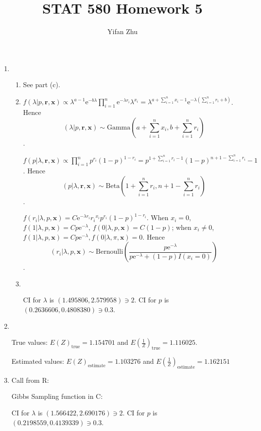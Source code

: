 \documentclass{article}
\begin{document}
	

	
	\title{STAT 580 Homework 5}
	\author{Yifan Zhu}
	\maketitle
	
	\begin{enumerate}[leftmargin = 0 em, label = \arabic*., font = \bfseries]
	\item 
	\begin{enumerate}
		\item 
		See part (c).
		\item 
		$f(\lambda | p, \bm r, \bm x) \propto \lambda^{a-1} \mathrm{e}^{-b \lambda} \prod_{i=1}^n \mathrm{e}^{-\lambda r_i} \lambda^{x_i} = \lambda^{a + \sum_{i=1}^n x_i - 1} \mathrm{e}^{- \lambda (\sum_{i=1}^n r_i + b)}$. Hence $$(\lambda | p, \bm r, \bm x) \sim \mathrm{Gamma}(a + \sum_{i=1}^n x_i , b + \sum_{i=1}^n r_i)$$.

		$f(p|\lambda, \bm r, \bm x) \propto \prod_{i=1}^n p^{r_i} (1 - p)^{1 - r_i} = p^{1 + \sum_{i=1}^n r_i - 1} (1 - p)^{n + 1 - \sum_{i=1}^n r_i} -1$. Hence $$(p | \lambda, \bm r, \bm x) \sim \mathrm{Beta}(1 + \sum_{i=1}^n r_i , n + 1 - \sum_{i=1}^n r_i)$$.

		$f(r_i | \lambda, p, \bm x) = C \mathrm{e}^{- \lambda r_i} {r_i}^{x_i} p^{r_i} (1 - p)^{1 - r_i}$. When $x_i = 0$, $f(1|\lambda, p, \bm x) = C p \mathrm{e}^{- \lambda},\, f(0| \lambda, p, \bm x) = C(1 - p)$; when $x_i \neq 0$, $f(1|\lambda, p, \bm x) = C p \mathrm{e}^{- \lambda}, f(0|\lambda, \pi, \bm x) = 0$. Hence
		$$(r_i | \lambda, p, \bm x) \sim \mathrm{Bernoulli}(\frac{p \mathrm{e}^{- \lambda}}{p \mathrm{e}^{- \lambda} + (1 - p) I(x_i = 0)})$$.

		\item \ 

		 

		CI for $\lambda$ is $(1.495806, 2.579958) \owns 2$. 
		CI for $p$ is $(0.2636606, 0.4808380) \owns 0.3$. 

	\end{enumerate}
	
	\newpage
	\item \ 

	

	True values: $E \left( Z \right)_{\mathrm{true}} = 1.154701 $ and $E \left( \frac{1}{Z} \right)_{\mathrm{true}} = 1.116025 $.

	Estimated values: $E \left( Z \right)_{\mathrm{estimate}} = 1.103276$ and $E \left( \frac{1}{Z} \right)_{\mathrm{estimate}} = 1.162151 $


	\item Call from R:
	

	Gibbs Sampling function in C:
	
	CI for $\lambda$ is $(1.566422, 2.690176) \owns 2$. 
	CI for $p$ is $(0.2198559, 0.4139339) \owns 0.3$. 
	
 	\end{enumerate}
	
	
\end{document}
